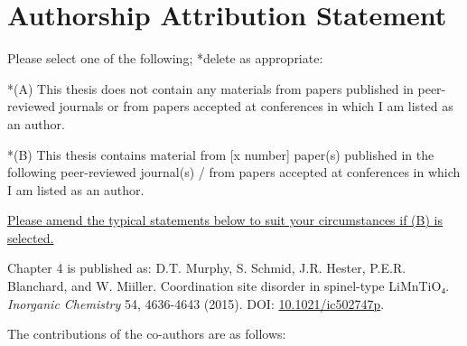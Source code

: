 \section*{Authorship Attribution Statement}

Please select one of the following; *delete as appropriate:

\vspace{0.5\baselineskip}

*(A) This thesis does not contain any materials from papers published in peer-reviewed journals or from papers accepted at conferences in which I am listed as an author.

\vspace{0.5\baselineskip}

*(B) This thesis contains material from [x number] paper(s) published in the following peer-reviewed journal(s) / from papers accepted at conferences in which I am listed as an author.

\vspace{0.5\baselineskip}

\textcolor{DeepGreen}{\underline{
Please amend the typical statements below to suit your circumstances if (B) is selected.
}}

\vspace{0.5\baselineskip}

Chapter 4 is published as: 
\textcolor{DeepGreen}{
D.T. Murphy, S. Schmid, J.R. Hester, P.E.R. Blanchard, and W. Miiller. Coordination site disorder in spinel-type LiMnTiO₄. \textit{Inorganic Chemistry} 54, 4636-4643 (2015). DOI: \href{https://doi.org/10.1021/ic502747p}{10.1021/ic502747p}.
}

\vspace{0.5\baselineskip}

The contributions of the co-authors are as follows:

